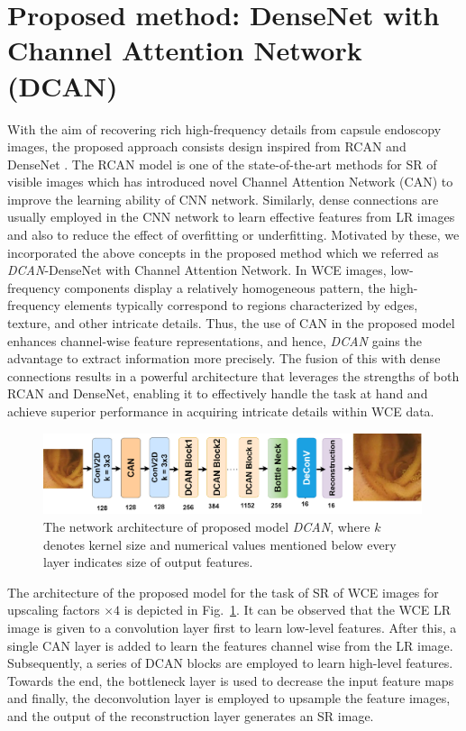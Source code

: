 \documentclass[conference]{IEEEtran}
\begin{document}
\section{Proposed method: DenseNet with Channel Attention Network (DCAN)}
With the aim of recovering rich high-frequency details from capsule endoscopy images, the proposed approach consists design inspired from RCAN \cite{RCAN} and DenseNet \cite{SRDensenet}. The RCAN model is one of the state-of-the-art methods for SR of visible images which has introduced novel Channel Attention Network (CAN) to improve the learning ability of CNN network. Similarly, dense connections are usually employed in the CNN network to learn effective features from LR images and also to reduce the effect of overfitting or underfitting.  Motivated by these, we incorporated the above concepts in the proposed method which we referred as \emph{DCAN}-DenseNet with Channel Attention Network. In WCE images, low-frequency components display a relatively homogeneous pattern, the high-frequency elements typically correspond to regions characterized by edges, texture, and other intricate details. Thus, the use of CAN in the proposed model enhances channel-wise feature representations, and hence, \emph{DCAN} gains the advantage to extract information more precisely. The fusion of this with dense connections results in a powerful architecture that leverages the strengths of both RCAN and DenseNet, enabling it to effectively handle the task at hand and achieve superior performance in acquiring intricate details within WCE data. 


\begin{figure}[t!]
    \centering
    \includegraphics[width=0.99\textwidth]{1_fff.drawio.png} 
    \caption{The network architecture of proposed model \emph{DCAN}, where $k$ denotes kernel size and numerical values mentioned below every layer indicates size of output features.}
    \label{fig:label6.8}
\end{figure}
The architecture of the proposed model for the task of SR of WCE images for upscaling factors $\times 4$ is depicted in Fig.~\ref{fig:label6.8}. It can be observed that the WCE LR image is given to a convolution layer first to learn low-level features. After this, a single CAN layer is added to learn the features channel wise from the LR image. Subsequently, a series of DCAN blocks are employed to learn high-level features. Towards the end, the bottleneck layer is used to decrease the input feature maps and finally, the deconvolution layer is employed to upsample the feature images, and the output of the reconstruction layer generates an SR image.
 
\end{document}
